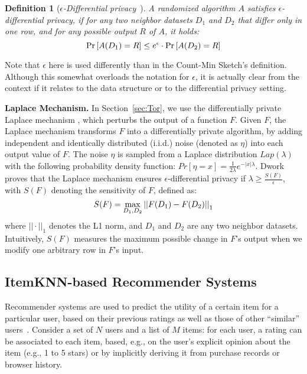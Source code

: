 \documentclass[conference]{IEEEtran}
\newcommand{\descr}[1]{\medskip \noindent \textbf{#1}}
\newtheorem{definition}{Definition}
\begin{document}
\begin{definition}[{\em $\epsilon$-Differential privacy}~\cite{dwork2006differential}]
A randomized algorithm $A$ satisfies $\epsilon$-differential privacy, if for any two neighbor datasets $D_1$ and $D_2$ that differ only in one row, and for any possible output $R$ of $A$, it holds: 
\[ 
\Pr \left[ A(D_1) = R \right] \leq e^{\epsilon} \cdot \Pr \left[ A(D_2) = R \right]  \vspace{-0.2cm}
\]
\end{definition}
Note that $\epsilon$ here is used differently than in the Count-Min Sketch's definition. Although this somewhat overloads the notation for $\epsilon$, it is actually clear from the context if it relates to the data structure or to the differential privacy setting.

\descr{Laplace Mechanism.} In Section~\ref{sec:Tor}, we use the differentially private Laplace mechanism \cite{dwork2006calibrating}, which perturbs the output of a function $F$. Given $F$, the Laplace mechanism transforms $F$ into a differentially private algorithm, by adding independent and identically distributed (i.i.d.) noise (denoted as $\eta$) into each output value of $F$. The noise $\eta$ is sampled from a Laplace distribution $Lap(\lambda)$ with the following probability density function: $Pr[\eta = x] = \frac{1}{2\lambda} e^{−|x|\lambda}$.
Dwork~\cite{dwork2006differential} proves that the Laplace mechanism ensures $\epsilon$-differential privacy if $\lambda \geq \frac{S(F)}{\epsilon}$, with  $S(F)$ denoting the sensitivity of $F$,
defined as:\vspace{-0.1cm}
$$S(F) = \max\limits_{D_1,D_2}{|| F(D_1) - F(D_2) ||}_1 \vspace{-0.1cm}$$
where ${|| \cdot ||}_1$ denotes the L1 norm, and $D_1$ and $D_2$ are any two neighbor datasets.
Intuitively, $S(F)$ measures the maximum possible change in $F$'s output when we modify one arbitrary row in $F$'s input.



\subsection{ItemKNN-based Recommender Systems}
\label{sec:recSystems}
Recommender systems are used to predict the utility of a certain item for a particular user, based on their previous ratings as well as those of other ``similar'' users~\cite{resnick1997recommender}.
Consider a set of $N$ users and a list of $M$ items:
for each user, a rating can be associated to each item, based, e.g., on the user's explicit opinion about the item (e.g., 1 to 5 stars) or by implicitly deriving it from purchase records or browser history.
\end{document}
